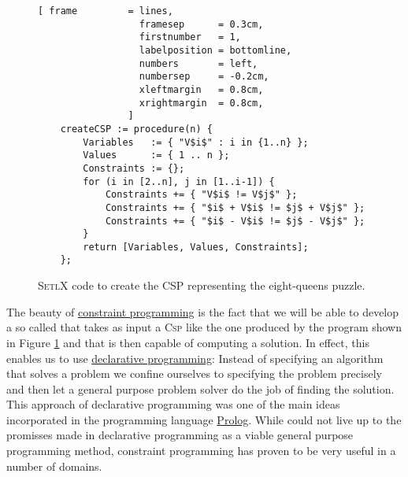 \begin{figure}[!ht]
\centering
\begin{Verbatim}[ frame         = lines, 
                  framesep      = 0.3cm, 
                  firstnumber   = 1,
                  labelposition = bottomline,
                  numbers       = left,
                  numbersep     = -0.2cm,
                  xleftmargin   = 0.8cm,
                  xrightmargin  = 0.8cm,
                ]
    createCSP := procedure(n) {
        Variables   := { "V$i$" : i in {1..n} };
        Values      := { 1 .. n };
        Constraints := {};
        for (i in [2..n], j in [1..i-1]) {
            Constraints += { "V$i$ != V$j$" };
            Constraints += { "$i$ + V$i$ != $j$ + V$j$" };
            Constraints += { "$i$ - V$i$ != $j$ - V$j$" };
        }
        return [Variables, Values, Constraints];
    };
\end{Verbatim}
\vspace*{-0.3cm}
\caption{\textsc{SetlX} code to create the CSP representing the eight-queens puzzle.}
\label{fig:queens-csp.stlx}
\end{figure}

The beauty of \href{https://en.wikipedia.org/wiki/Constraint_programming}{constraint programming} is the fact
that we will be able to develop a so called  that takes as input a \textsc{Csp}
like the one produced by the program shown in Figure \ref{fig:queens-csp.stlx} and that is then capable of
computing a solution.  In effect, this enables us to use
\href{https://en.wikipedia.org/wiki/Declarative_programming}{declarative programming}:  Instead of specifying
an algorithm that solves a problem we confine ourselves to  specifying the problem precisely and then let a
general purpose problem solver do the job of finding the solution.  This approach of declarative programming 
was one of the main ideas incorporated in the programming language
\href{https://en.wikipedia.org/wiki/Prolog}{Prolog}.  While  could not live up to the promisses
made in declarative programming as a viable general purpose programming method, constraint programming has
proven to be very useful in a number of domains. 
\pagebreak

